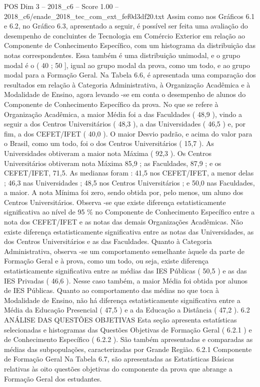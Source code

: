 \begin{textsample}{POS Dim 3 – 2018\_c6 – Score 1.00 – 2018\_c6/enade\_2018\_tec\_com\_ext\_fef0d3df20.txt}
Assim como nos Gráficos 6.1 e 6.2, no Gráfico 6.3, apresentado a seguir, é possível ser feita uma avaliação do desempenho de concluintes de Tecnologia em Comércio Exterior em relação ao Componente de Conhecimento Específico, com um histograma da distribuição das notas correspondentes.
Essa também é uma distribuição unimodal, e o grupo modal é o ( 40 ; 50 ], igual ao grupo modal da prova, como um todo, e ao grupo modal para a Formação Geral.
Na Tabela 6.6, é apresentada uma comparação dos resultados em relação à Categoria Administrativa, à Organização Acadêmica e à Modalidade de Ensino, agora levando -se em conta o desempenho de alunos do Componente de Conhecimento Específico da prova.
No que se refere à Organização Acadêmica, a maior Média foi a das Faculdades ( 48,9 ), vindo a seguir a dos Centros Universitários ( 48,3 ), a das Universidades ( 46,5 ) e, por fim, a dos CEFET/IFET ( 40,0 ).
O maior Desvio padrão, e acima do valor para o Brasil, como um todo, foi o dos Centros Universitários ( 15,7 ).
As Universidades obtiveram a maior nota Máxima ( 92,3 ).
Os Centros Universitários obtiveram nota Máxima 85,9 ; as Faculdades, 87,9 ; e os CEFET/IFET, 71,5.
As medianas foram : 41,5 nos CEFET/IFET, a menor delas ; 46,3 nas Universidades ; 48,5 nos Centros Universitários ; e 50,0 nas Faculdades, a maior.
A nota Mínima foi zero, sendo obtida por, pelo menos, um aluno dos Centros Universitários.
Observa -se que existe diferença estatisticamente significativa ao nível de 95 \% no Componente de Conhecimento Específico entre a nota dos CEFET/IFET e as notas das demais Organizações Acadêmicas.
Não existe diferença estatisticamente significativa entre as notas das Universidades, as dos Centros Universitários e as das Faculdades.
Quanto à Categoria Administrativa, observa -se um comportamento semelhante àquele da parte de Formação Geral e à prova, como um todo, ou seja, existe diferença estatisticamente significativa entre as médias das IES Públicas ( 50,5 ) e as das IES Privadas ( 46,6 ).
Nesse caso também, a maior Média foi obtida por alunos de IES Públicas.
Quanto ao comportamento das médias no que toca à Modalidade de Ensino, não há diferença estatisticamente significativa entre a Média da Educação Presencial ( 47,5 ) e a da Educação a Distância ( 47,2 ). 6.2 ANÁLISE DAS QUESTÕES OBJETIVAS Esta seção apresenta estatísticas selecionadas e histogramas das Questões Objetivas de Formação Geral ( 6.2.1 ) e de Conhecimento Específico ( 6.2.2 ).
São também apresentadas e comparadas as médias das subpopulações, caracterizadas por Grande Região. 6.2.1 Componente de Formação Geral Na Tabela 6.7, são apresentadas as Estatísticas Básicas relativas às oito questões objetivas do componente da prova que abrange a Formação Geral dos estudantes.

\end{textsample}
